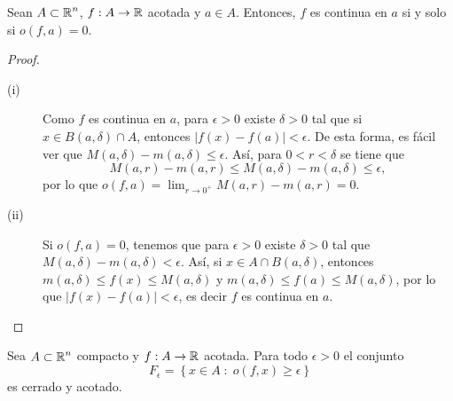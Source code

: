 \begin{prop}
Sean $\displaystyle A \subset \mathbb{R}^{n} $, $\displaystyle f : A \to \mathbb{R} $ acotada y $\displaystyle a \in A $. Entonces, $\displaystyle f $ es continua en $\displaystyle a $ si y solo si $\displaystyle o\left(f,a\right)= 0 $. 
\end{prop}
\begin{proof}
\begin{description}
\item[(i)] Como $\displaystyle f $ es continua en $\displaystyle a $, para $\displaystyle \epsilon > 0 $ existe $\displaystyle \delta > 0 $ tal que si $\displaystyle x \in B\left(a, \delta \right)\cap A $, entonces $\displaystyle \left|f\left(x\right)-f\left(a\right)\right| < \epsilon  $. De esta forma, es fácil ver que $\displaystyle M\left(a,\delta \right)-m\left(a,\delta \right)\leq \epsilon  $. Así, para $\displaystyle 0 < r < \delta  $ se tiene que 
	\[M\left(a,r\right) - m\left(a,r\right)\leq M\left(a, \delta \right)-m\left(a,\delta \right) \leq \epsilon  ,\]
	por lo que $\displaystyle o\left(f,a\right)=\lim_{r \to 0^{+}}M\left(a,r\right)-m\left(a,r\right)=0 $. 
\item[(ii)] Si $\displaystyle o\left(f,a\right)=0 $, tenemos que para $\displaystyle \epsilon > 0 $ existe $\displaystyle \delta > 0 $ tal que $\displaystyle M\left(a, \delta \right)-m\left(a,\delta \right) < \epsilon  $. Así, si $\displaystyle x \in A \cap B\left(a, \delta \right) $, entonces $\displaystyle m\left(a, \delta \right)\leq f\left(x\right) \leq M\left(a,\delta \right) $ y $\displaystyle m\left(a,\delta \right)\leq f\left(a\right)\leq M\left(a, \delta \right) $, por lo que $\displaystyle \left|f\left(x\right)-f\left(a\right)\right| < \epsilon  $, es decir $\displaystyle f $ es continua en $\displaystyle a $. 
\end{description}
\end{proof}
\begin{lema}
Sea $\displaystyle A \subset \mathbb{R}^{n} $ compacto y $\displaystyle f :A \to \mathbb{R} $ acotada. Para todo $\displaystyle \epsilon > 0 $ el conjunto 
\[F_{\epsilon } = \left\{ x \in A \; : \; o\left(f,x\right)\geq \epsilon \right\}  \]
es cerrado y acotado. 
\end{lema}
